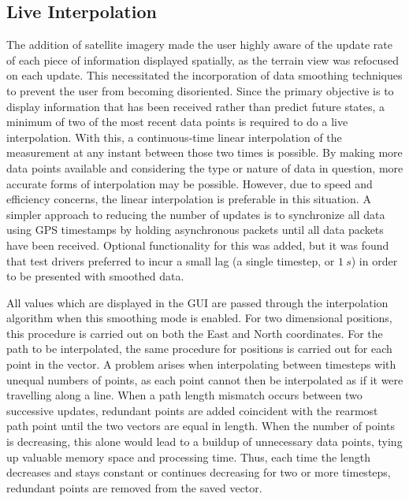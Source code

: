 \documentclass[twocolumn,10pt]{article}
\begin{document}
  \subsection*{Live Interpolation}

    The addition of satellite imagery made the user highly aware of the update rate of each piece of information displayed spatially, as the terrain view was refocused on each update.  This necessitated the incorporation of data smoothing techniques to prevent the user from becoming disoriented.
    Since the primary objective is to display information that has been received rather than predict future states, a minimum of two of the most recent data points is required to do a live interpolation.  With this, a continuous-time linear interpolation of the measurement at any instant between those two times is possible.  By making more data points available and considering the type or nature of data in question, more accurate forms of interpolation may be possible. However, due to speed and efficiency concerns, the linear interpolation is preferable in this situation.
    A simpler approach to reducing the number of updates is to synchronize all data using GPS timestamps by holding asynchronous packets until all data packets have been received.  Optional functionality for this was added, but it was found that test drivers preferred to incur a small lag (a single timestep, or $1~s$) in order to be presented with smoothed data.
    
    All values which are displayed in the GUI are passed through the interpolation algorithm when this smoothing mode is enabled.
    For two dimensional positions, this procedure is carried out on both the East and North coordinates. 
    For the path to be interpolated,  the same procedure for positions is carried out for each point in the vector. A problem arises when interpolating between timesteps with unequal numbers of points, as each point cannot then be interpolated as if it were travelling along a line. When a path length mismatch occurs between two successive updates, redundant points are added coincident with the rearmost path point until the two vectors are equal in length. When the number of points is decreasing, this alone would lead to a buildup of unnecessary data points, tying up valuable memory space and processing time. Thus, each time the length decreases and stays constant or continues decreasing for two or more timesteps, redundant points are removed from the saved vector.
\end{document}

